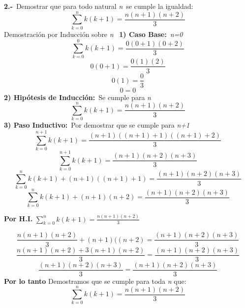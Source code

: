 
\textbf{2.-}\ Demostrar que para todo natural \textit{n}\ se cumple la igualdad:
\[
\sum_{k=0}^{n}k(k+1) = \frac{n(n+1)(n+2)}{3}
\]
Demostración por Inducción sobre \textit{n}\
\newline
\textbf{1) Caso Base:}\ \textit{n=0}\
\[
\sum_{k=0}^{0}k(k+1) = \frac{0(0+1)(0+2)}{3}
\]
\[
0(0+1) = \frac{0(1)(2)}{3}
\]
\[
0(1) = \frac{0}{3}
\]
\[
0 = 0
\]
\textbf{2) Hipótesis de Inducción:}\  Se cumple para \textit{n}\
\[
\sum_{k=0}^{n}k(k+1) = \frac{n(n+1)(n+2)}{3}
\]
\textbf{3) Paso Inductivo:}\  Por demostrar que se cumple para \textit{n+1}\
\[
\sum_{k=0}^{n+1}k(k+1) = \frac{(n+1)((n+1)+1)((n+1)+2)}{3}
\]
\[
\sum_{k=0}^{n+1}k(k+1) = \frac{(n+1)(n+2)(n+3)}{3}
\]
\[
\sum_{k=0}^{n}k(k+1) + (n+1)((n+1)+1) = \frac{(n+1)(n+2)(n+3)}{3}
\]
\[
\sum_{k=0}^{n}k(k+1) + (n+1)(n+2) = \frac{(n+1)(n+2)(n+3)}{3}
\]
\begin{center}
\textbf{Por H.I.} $\sum_{k=0}^{n}k(k+1) = \frac{n(n+1)(n+2)}{3}$ 
\end{center}
\[
\frac{n(n+1)(n+2)}{3} + (n+1)((n+2) = \frac{(n+1)(n+2)(n+3)}{3}
\]
\[
\frac{n(n+1)(n+2) + 3(n+1)(n+2)}{3} = \frac{(n+1)(n+2)(n+3)}{3}
\]
\[
\frac{(n+1)(n+2)(n+3)}{3} = \frac{(n+1)(n+2)(n+3)}{3}
\]
\newline
\textbf{Por lo tanto} Demostramos que se cumple para toda \textit{n} que: 
\[
\sum_{k=0}^{n}k(k+1) = \frac{n(n+1)(n+2)}{3}
\]